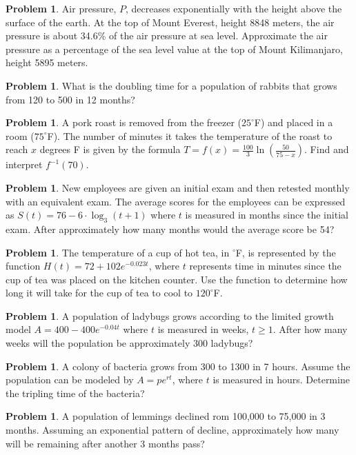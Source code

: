 \documentclass[11pt]{scrartcl}
\theoremstyle{definition}
\newtheorem{problem}[theorem]{Problem}
\begin{document}
\begin{problem}
	Air pressure, $P$, decreases exponentially with the height above the surface of the earth. At the top of Mount Everest, height 8848 meters, the air pressure is about 34.6\% of the air pressure at sea level. Approximate the air pressure as a percentage of the sea level value at the top of Mount Kilimanjaro, height 5895 meters.
\end{problem}



\begin{problem}
	What is the doubling time for a population of rabbits that grows from 120 to 500 in 12 months?
\end{problem}

\begin{problem}
	A pork roast is removed from the freezer ($25^\circ$F) and placed in a room ($75^\circ$F). The number of minutes it takes the temperature of the roast to reach $x$ degrees F is given by the formula $T=f(x)=\frac{100}{3}\ln\left(\frac{50}{75-x}\right)$. Find and interpret $f^{-1}(70)$.
\end{problem}

\begin{problem}
	New employees are given an initial exam and then retested monthly with an equivalent exam. The average scores for the employees can be expressed as $S(t)=76-6\cdot \log_{3}(t+1)$ where $t$ is measured in months since the initial exam. After approximately how many months would the average score be 54?
\end{problem}

\begin{problem}
	The temperature of a cup of hot tea, in $^\circ$F, is represented by the function $H(t)=72+102e^{-0.023t}$, where $t$ represents time in minutes since the cup of tea was placed on the kitchen counter. Use the function to determine how long it will take for the cup of tea to cool to $120^\circ$F. 
\end{problem}

\begin{problem}
	A population of ladybugs grows according to the limited growth model $A=400-400e^{-0.04t}$ where $t$ is measured in weeks, $t \geq 1$. After how many weeks will the population be approximately 300 ladybugs?
\end{problem}

\begin{problem}
	A colony of bacteria grows from 300 to 1300 in 7 hours. Assume the population can be modeled by $A=pe^{rt}$, where $t$ is measured in hours. Determine the tripling time of the bacteria?
\end{problem}

\begin{problem}
	A population of lemmings declined rom 100,000 to 75,000 in 3 months. Assuming an exponential pattern of decline, approximately how many will be remaining after another 3 months pass?
\end{problem}
\end{document}
